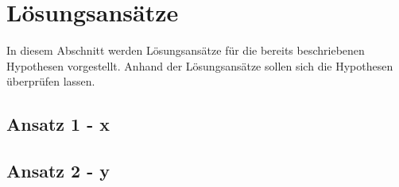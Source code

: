 
\section{Lösungsansätze}
\label{sec:loesungen}

In diesem Abschnitt werden Lösungsansätze für die bereits beschriebenen Hypothesen vorgestellt. Anhand der Lösungsansätze sollen sich die Hypothesen überprüfen lassen. 

\subsection{Ansatz 1 - x}

\subsection{Ansatz 2 - y}
